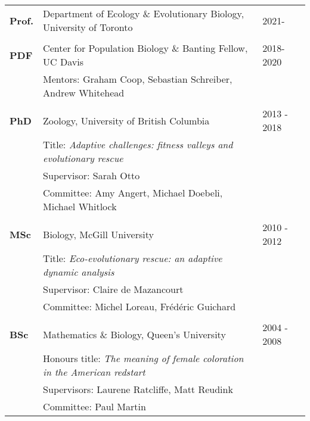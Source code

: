 \documentclass[12pt]{article}
\begin{document}

\section*{}

\begin{tabular}{lll}
\textbf{Prof.} & Department of Ecology \& Evolutionary Biology, University of Toronto\hspace{0.5cm} & 2021-\\
\\
\textbf{PDF} & Center for Population Biology \& Banting Fellow, UC Davis & 2018-2020\\
& Mentors: Graham Coop, Sebastian Schreiber, Andrew Whitehead\\
\\


\textbf{PhD} & Zoology, University of British Columbia & 2013 - 2018\\
& Title: \textit{Adaptive challenges: fitness valleys and evolutionary rescue}\\
& Supervisor: Sarah Otto\\
& Committee: Amy Angert, Michael Doebeli, Michael Whitlock\\
\\
\textbf{MSc} & Biology, McGill University & 2010 - 2012 \\
& Title: \textit{Eco-evolutionary rescue: an adaptive dynamic analysis}  \\
& Supervisor: Claire de Mazancourt\\
& Committee: Michel Loreau, Fr\'{e}d\'{e}ric Guichard\\
\\
\textbf{BSc} &  Mathematics \& Biology, Queen's University & 2004 - 2008\\ %
& Honours title: \textit{The meaning of female coloration in the American redstart}  \\
& Supervisors: Laurene Ratcliffe, Matt Reudink\\
& Committee: Paul Martin\\
\end{tabular}
\end{document}
